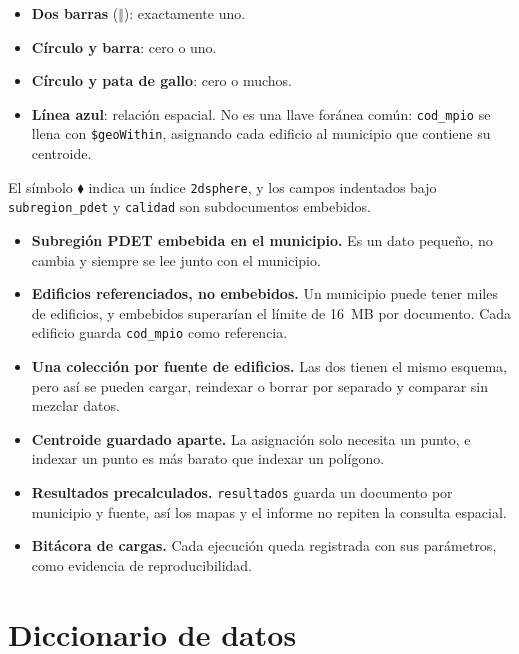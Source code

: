 \documentclass[11pt,a4paper]{article}
\newcommand{\campo}[1]{\texttt{#1}}
\begin{document}
\begin{itemize}
  \item \textbf{Dos barras} ($\Vert$): exactamente uno.
  \item \textbf{Círculo y barra}: cero o uno.
  \item \textbf{Círculo y pata de gallo}: cero o muchos.
  \item \textbf{Línea azul}: relación espacial. No es una llave foránea
        común: \campo{cod\_mpio} se llena con \campo{\$geoWithin}, asignando
        cada edificio al municipio que contiene su centroide.
\end{itemize}
 
El símbolo $\blacklozenge$ indica un índice
\campo{2dsphere}, y los campos indentados bajo \campo{subregion\_pdet} y
\campo{calidad} son subdocumentos embebidos.
 
\begin{itemize}
  \item \textbf{Subregión PDET embebida en el municipio.} Es un dato pequeño,
        no cambia y siempre se lee junto con el municipio.
  \item \textbf{Edificios referenciados, no embebidos.} Un municipio puede
        tener miles de edificios, y embebidos superarían el límite de 16~MB
        por documento. Cada edificio guarda \campo{cod\_mpio} como
        referencia.
  \item \textbf{Una colección por fuente de edificios.} Las dos tienen el
        mismo esquema, pero así se pueden cargar, reindexar o borrar por
        separado y comparar sin mezclar datos.
  \item \textbf{Centroide guardado aparte.} La asignación solo necesita un
        punto, e indexar un punto es más barato que indexar un polígono.
  \item \textbf{Resultados precalculados.} \campo{resultados} guarda un
        documento por municipio y fuente, así los mapas y el informe no
        repiten la consulta espacial.
  \item \textbf{Bitácora de cargas.} Cada ejecución queda registrada con sus
        parámetros, como evidencia de reproducibilidad.
\end{itemize}

\section{Diccionario de datos}
\label{sec:diccionario}
\end{document}
